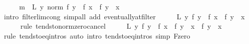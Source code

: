 \begin{isabellebody}
\ \ \isamarkupfalse%
\ \isamarkupfalse%
\ {\isachardoublequoteopen}{\isacharquery}{\kern0pt}m\ {\isasymlongleftrightarrow}\ {\isacharquery}{\kern0pt}L\ {\isacharparenleft}{\kern0pt}{\isasymlambda}y{\isachardot}{\kern0pt}\ norm\ {\isacharparenleft}{\kern0pt}{\isacharparenleft}{\kern0pt}f\ y\ {\isacharminus}{\kern0pt}\ f\ x{\isacharparenright}{\kern0pt}\ {\isacharminus}{\kern0pt}\ f{\isacharprime}{\kern0pt}\ {\isacharparenleft}{\kern0pt}y\ {\isacharminus}{\kern0pt}\ x{\isacharparenright}{\kern0pt}{\isacharparenright}{\kern0pt}{\isacharparenright}{\kern0pt}{\isachardoublequoteclose}\isanewline
\ \ \ \ \isamarkupfalse%
\ {\isacharparenleft}{\kern0pt}intro\ filterlim{\isacharunderscore}{\kern0pt}cong{\isacharparenright}{\kern0pt}\ {\isacharparenleft}{\kern0pt}simp{\isacharunderscore}{\kern0pt}all\ add{\isacharcolon}{\kern0pt}\ eventually{\isacharunderscore}{\kern0pt}at{\isacharunderscore}{\kern0pt}filter{\isacharparenright}{\kern0pt}\isanewline
\ \ \isamarkupfalse%
\ \isamarkupfalse%
\ {\isachardoublequoteopen}{\isacharquery}{\kern0pt}L\ {\isacharparenleft}{\kern0pt}{\isasymlambda}y{\isachardot}{\kern0pt}\ {\isacharparenleft}{\kern0pt}f\ y\ {\isacharminus}{\kern0pt}\ f\ x{\isacharparenright}{\kern0pt}\ {\isacharminus}{\kern0pt}\ f{\isacharprime}{\kern0pt}\ {\isacharparenleft}{\kern0pt}y\ {\isacharminus}{\kern0pt}\ x{\isacharparenright}{\kern0pt}{\isacharparenright}{\kern0pt}{\isachardoublequoteclose}\isanewline
\ \ \ \ \isamarkupfalse%
\ {\isacharparenleft}{\kern0pt}rule\ tendsto{\isacharunderscore}{\kern0pt}norm{\isacharunderscore}{\kern0pt}zero{\isacharunderscore}{\kern0pt}cancel{\isacharparenright}{\kern0pt}\isanewline
\ \ \isamarkupfalse%
\ \isamarkupfalse%
\ {\isachardoublequoteopen}{\isacharquery}{\kern0pt}L\ {\isacharparenleft}{\kern0pt}{\isasymlambda}y{\isachardot}{\kern0pt}\ {\isacharparenleft}{\kern0pt}{\isacharparenleft}{\kern0pt}f\ y\ {\isacharminus}{\kern0pt}\ f\ x{\isacharparenright}{\kern0pt}\ {\isacharminus}{\kern0pt}\ f{\isacharprime}{\kern0pt}\ {\isacharparenleft}{\kern0pt}y\ {\isacharminus}{\kern0pt}\ x{\isacharparenright}{\kern0pt}{\isacharparenright}{\kern0pt}\ {\isacharplus}{\kern0pt}\ f{\isacharprime}{\kern0pt}\ {\isacharparenleft}{\kern0pt}y\ {\isacharminus}{\kern0pt}\ x{\isacharparenright}{\kern0pt}{\isacharparenright}{\kern0pt}{\isachardoublequoteclose}\isanewline
\ \ \ \ \isamarkupfalse%
\ {\isacharparenleft}{\kern0pt}rule\ tendsto{\isacharunderscore}{\kern0pt}eq{\isacharunderscore}{\kern0pt}intros{\isacharparenright}{\kern0pt}\ {\isacharparenleft}{\kern0pt}auto\ intro{\isacharbang}{\kern0pt}{\isacharcolon}{\kern0pt}\ tendsto{\isacharunderscore}{\kern0pt}eq{\isacharunderscore}{\kern0pt}intros\ simp{\isacharcolon}{\kern0pt}\ F{\isachardot}{\kern0pt}zero{\isacharparenright}{\kern0pt}\isanewline

\end{isabellebody}
